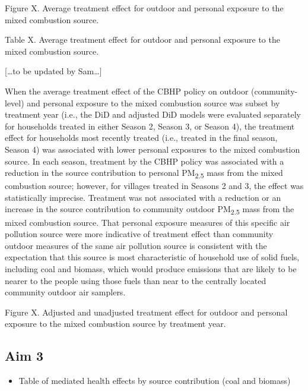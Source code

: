 \documentclass[
  letterpaper,
  DIV=11,
  numbers=noendperiod]{scrartcl}
\providecommand{\tightlist}{%
  \setlength{\itemsep}{0pt}\setlength{\parskip}{0pt}}\usepackage{longtable,booktabs,array}
\begin{document}
Figure X. Average treatment effect for outdoor and personal exposure to
the mixed combustion source.

Table X. Average treatment effect for outdoor and personal exposure to
the mixed combustion source.

{[}\ldots to be updated by Sam\ldots{]}

When the average treatment effect of the CBHP policy on outdoor
(community-level) and personal exposure to the mixed combustion source
was subset by treatment year (i.e., the DiD and adjusted DiD models were
evaluated separately for households treated in either Season 2, Season
3, or Season 4), the treatment effect for households most recently
treated (i.e., treated in the final season, Season 4) was associated
with lower personal exposures to the mixed combustion source. In each
season, treatment by the CBHP policy was associated with a reduction in
the source contribution to personal PM\textsubscript{2.5} mass from the
mixed combustion source; however, for villages treated in Seasons 2 and
3, the effect was statistically imprecise. Treatment was not associated
with a reduction or an increase in the source contribution to community
outdoor PM\textsubscript{2.5} mass from the mixed combustion source.
That personal exposure measures of this specific air pollution source
were more indicative of treatment effect than community outdoor measures
of the same air pollution source is consistent with the expectation that
this source is most characteristic of household use of solid fuels,
including coal and biomass, which would produce emissions that are
likely to be nearer to the people using those fuels than near to the
centrally located community outdoor air samplers.

Figure X. Adjusted and unadjusted treatment effect for outdoor and
personal exposure to the mixed combustion source by treatment year.

\hypertarget{aim-3}{%
\subsection{Aim 3}\label{aim-3}}

\begin{itemize}
\tightlist
\item
  Table of mediated health effects by source contribution (coal and
  biomass)
\end{itemize}
\end{document}
